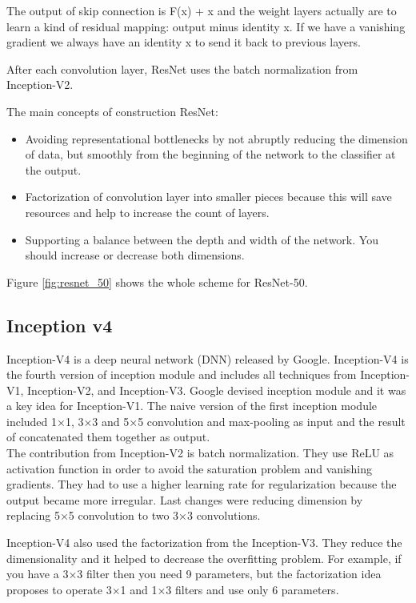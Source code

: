 \documentclass[titlepage]{report}
\begin{document}
The output of skip connection is  F(x) + x and the weight layers actually are to learn a kind of residual mapping: output minus identity x. If we have a vanishing gradient we always have an identity x to send it back to previous layers. 

After each convolution layer, ResNet uses the batch normalization from Inception-V2. 

The main concepts of construction ResNet:
\begin{itemize}
\item Avoiding representational bottlenecks by not abruptly reducing the dimension of data, but smoothly from the beginning of the network to the classifier at the output.
\item Factorization of convolution layer into smaller pieces because this will save resources and help to increase the count of layers.
\item Supporting a balance between the depth and width of the network. You should increase or decrease both dimensions.
\end{itemize}

Figure \ref{fig:resnet_50} shows the whole scheme for ResNet-50.

\subsection{Inception v4}
Inception-V4 is a deep neural network (DNN) released by Google. Inception-V4 is the fourth version of inception module and includes all techniques from Inception-V1, Inception-V2, and Inception-V3. Google devised inception module and it was a key idea for Inception-V1. The naive version of the first inception module included 1×1, 3×3 and 5×5 convolution and max-pooling as input and the result of concatenated them together as output. \\

The contribution from Inception-V2 is batch normalization. They use ReLU as activation function in order to avoid the saturation problem and vanishing gradients. They had to use a higher learning rate for regularization because the output became more irregular. Last changes were reducing dimension by replacing  5×5 convolution to two 3×3 convolutions. 

Inception-V4 also used the factorization from the Inception-V3. They reduce the dimensionality and it helped to decrease the overfitting problem. For example, if you have a 3×3 filter then you need 9 parameters, but the factorization idea proposes to operate  3×1 and  1×3 filters and use only 6 parameters. 
\end{document}
